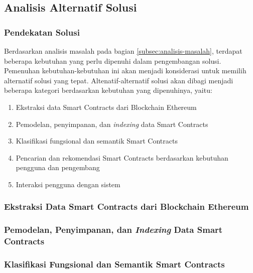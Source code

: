 \subsection{Analisis Alternatif Solusi}

\subsubsection{Pendekatan Solusi}
Berdasarkan analisis masalah pada bagian \ref{subsec:analisis-masalah}, terdapat beberapa kebutuhan yang perlu dipenuhi dalam pengembangan solusi. Pemenuhan kebutuhan-kebutuhan ini akan menjadi konsiderasi untuk memilih alternatif solusi yang tepat. Altenatif-alternatif solusi akan dibagi menjadi beberapa kategori berdasarkan kebutuhan yang dipenuhinya, yaitu:

\begin{enumerate}
  \item Ekstraksi data Smart Contracts dari Blockchain Ethereum
  \item Pemodelan, penyimpanan, dan \textit{indexing} data Smart Contracts
  \item Klasifikasi fungsional dan semantik Smart Contracts
  \item Pencarian dan rekomendasi Smart Contracts berdasarkan kebutuhan pengguna dan pengembang
  \item Interaksi pengguna dengan sistem
\end{enumerate}


\subsubsection{Ekstraksi Data Smart Contracts dari Blockchain Ethereum}

\subsubsection{Pemodelan, Penyimpanan, dan \textit{Indexing} Data Smart Contracts}

\subsubsection{Klasifikasi Fungsional dan Semantik Smart Contracts}

